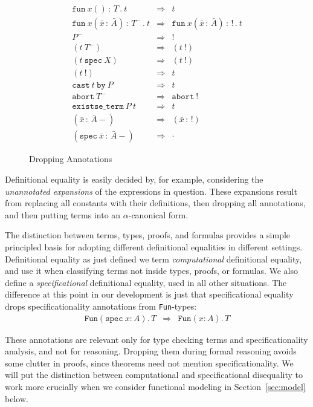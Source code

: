 \documentclass[preprint,natbib]{sigplanconf}
\newcommand{\bang}[0]{\texttt{!}}
\newcommand{\To}{\Rightarrow}
\begin{document}
\begin{figure}
\[
\begin{array}{lll} 
\texttt{fun}\ x()\, :\, T\, .\ t & \To & t \\
\texttt{fun}\ x(\bar{x}\,:\,\bar{A})\, :\, T^-\, .\ t & \To &
\texttt{fun}\ x(\bar{x}\,:\,\bar{A})\, :\, \bang\, .\ t \\
P^- & \To & \bang \\
(t\ T^-) & \To & (t\ \bang) \\
(t\ \texttt{spec}\ X) & \To & (t\ \bang) \\
(t\ \bang) & \To & t \\
\texttt{cast}\ t\ \texttt{by}\ P & \To & t \\
\texttt{abort}\ T^- & \To & \texttt{abort}\ \bang \\
\texttt{existse\_term}\ P\ t & \To & t \\
(\bar{x}\,:\,\bar{A}-) & \To & (\bar{x}\,:\,\bang) \\
(\texttt{spec}\ \bar{x}\,:\,\bar{A}-) & \To & \cdot
\end{array}
\]
\caption{\label{fig:dropannos}Dropping Annotations}
\end{figure}

Definitional equality is easily decided by, for example, considering
the \emph{unannotated expansions} of the expressions in question.
These expansions result from replacing all constants with their
definitions, then dropping all annotations, and then putting terms
into an $\alpha$-canonical form.

The distinction between terms, types, proofs, and formulas provides a
simple principled basis for adopting different definitional equalities
in different settings.  Definitional equality as just defined we term
\emph{computational} definitional equality, and use it when
classifying terms not inside types, proofs, or formulas.  We also
define a \emph{specificational} definitional equality, used in all
other situations.  The difference at this point in our development is
just that specificational equality drops specificationality
annotations from \texttt{Fun}-types:
\[
\begin{array}{lll} 
\texttt{Fun}(\texttt{spec}\ x:A).\,T & \To & 
\texttt{Fun}(x:A).\,T 
\end{array}
\]

\noindent These annotations are relevant only for type checking terms
and specificationality analysis, and not for reasoning.  Dropping them
during formal reasoning avoids some clutter in proofs, since theorems
need not mention specificationality.  We will put the distinction
between computational and specificational disequality to work more
crucially when we consider functional modeling in
Section~\ref{sec:model} below.
\end{document}
